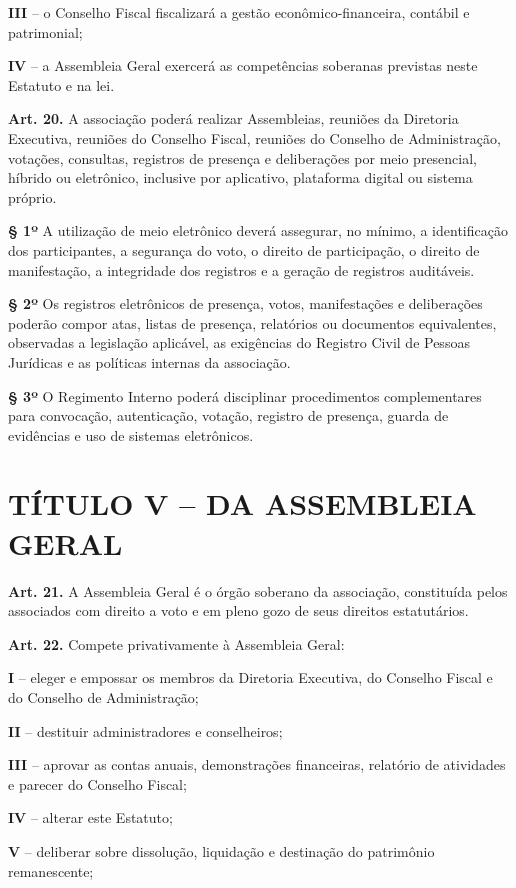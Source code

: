 \documentclass[11pt,a4paper]{article}
\begin{document}
\textbf{III} -- o Conselho Fiscal fiscalizará a gestão econômico-financeira, contábil e patrimonial;

\textbf{IV} -- a Assembleia Geral exercerá as competências soberanas previstas neste Estatuto e na lei.

\textbf{Art. 20.} A associação poderá realizar Assembleias, reuniões da Diretoria Executiva, reuniões do Conselho Fiscal, reuniões do Conselho de Administração, votações, consultas, registros de presença e deliberações por meio presencial, híbrido ou eletrônico, inclusive por aplicativo, plataforma digital ou sistema próprio.

\textbf{§ 1º} A utilização de meio eletrônico deverá assegurar, no mínimo, a identificação dos participantes, a segurança do voto, o direito de participação, o direito de manifestação, a integridade dos registros e a geração de registros auditáveis.

\textbf{§ 2º} Os registros eletrônicos de presença, votos, manifestações e deliberações poderão compor atas, listas de presença, relatórios ou documentos equivalentes, observadas a legislação aplicável, as exigências do Registro Civil de Pessoas Jurídicas e as políticas internas da associação.

\textbf{§ 3º} O Regimento Interno poderá disciplinar procedimentos complementares para convocação, autenticação, votação, registro de presença, guarda de evidências e uso de sistemas eletrônicos.

\section*{TÍTULO V -- DA ASSEMBLEIA GERAL}

\textbf{Art. 21.} A Assembleia Geral é o órgão soberano da associação, constituída pelos associados com direito a voto e em pleno gozo de seus direitos estatutários.

\textbf{Art. 22.} Compete privativamente à Assembleia Geral:

\textbf{I} -- eleger e empossar os membros da Diretoria Executiva, do Conselho Fiscal e do Conselho de Administração;

\textbf{II} -- destituir administradores e conselheiros;

\textbf{III} -- aprovar as contas anuais, demonstrações financeiras, relatório de atividades e parecer do Conselho Fiscal;

\textbf{IV} -- alterar este Estatuto;

\textbf{V} -- deliberar sobre dissolução, liquidação e destinação do patrimônio remanescente;
\end{document}
